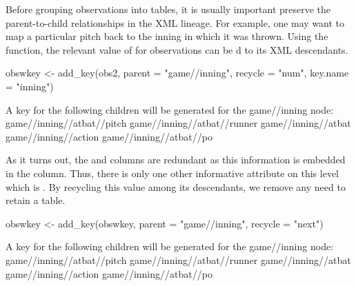 \documentclass[a4paper]{report}\usepackage[]{graphicx}\usepackage[]{color}
\begin{document}
\begin{article}
\begin{Schunk}
\end{Schunk}


Before grouping observations into tables, it is usually important
preserve the parent-to-child relationships in the XML lineage. For
example, one may want to map a particular pitch back to the inning
in which it was thrown. Using the  function, the relevant
value of  for  observations can be
d to its XML descendants.

\begin{Schunk}
\begin{Sinput}
obswkey <- add_key(obs2, parent = "game//inning", recycle = "num", key.name = "inning")
\end{Sinput}
\begin{Soutput}
A key for the following children will be generated for the game//inning node:
game//inning//atbat//pitch
game//inning//atbat//runner
game//inning//atbat
game//inning//action
game//inning//atbat//po
\end{Soutput}
\end{Schunk}


As it turns out, the  and  columns
are redundant as this information is embedded in the  column.
Thus, there is only one other informative attribute on this level
which is . By recycling this value among its descendants,
we remove any need to retain a  table.

\begin{Schunk}
\begin{Sinput}
obswkey <- add_key(obswkey, parent = "game//inning", recycle = "next")
\end{Sinput}
\begin{Soutput}
A key for the following children will be generated for the game//inning node:
game//inning//atbat//pitch
game//inning//atbat//runner
game//inning//atbat
game//inning//action
game//inning//atbat//po
\end{Soutput}
\end{Schunk}



\end{article}
\end{document}
